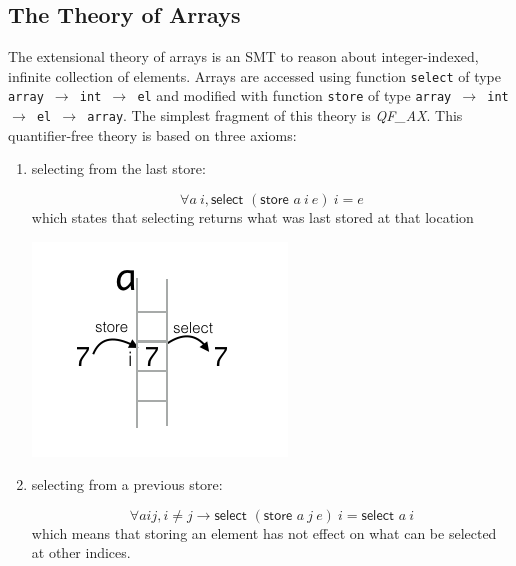 \documentclass[onecolumn, preprint]{sigplanconf}
\begin{document}
\subsection{The Theory of Arrays}
The extensional theory of arrays is an SMT to reason about integer-indexed, infinite collection of elements. Arrays are accessed using function \texttt{select} of type \texttt{array $\rightarrow$ int $\rightarrow$ el} and modified with function \texttt{store} of type \texttt{array $\rightarrow$ int $\rightarrow$ el $\rightarrow$ array}. The simplest fragment of this theory is \emph{QF\_AX}. This quantifier-free theory is based on three axioms:
\begin{enumerate}
\item selecting from the last store:

  \begin{minipage}{.5\textwidth}
    
  $$ \forall a\ i, \textsf{select } (\textsf{store } a\ i\ e)\ i = e$$
which states that selecting returns what was last stored at that location
  \end{minipage}
  \begin{minipage}{.5\textwidth}
    \centering
\includegraphics[scale=0.5]{pictures/axiom1.png}
\end{minipage}
  
\item selecting from a previous store:

  \begin{minipage}{.5\textwidth}

  $$ \forall a i j, i \neq j \to \textsf{select } (\textsf{store } a\ j\ e)\ i = \textsf{select } a\ i$$
    which means that storing an element has not effect on what can be selected at other indices.
    \end{minipage}
  \begin{minipage}{.5\textwidth}
  \centering
  

\end{minipage}
\end{enumerate}
\end{document}
